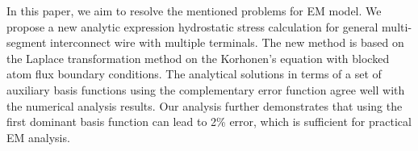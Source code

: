 




In this paper, we aim to resolve the mentioned problems for EM
model. We propose a new analytic expression hydrostatic stress
calculation for general multi-segment interconnect wire with multiple
terminals. The new method is based on the Laplace transformation
method on the Korhonen's equation with blocked atom flux boundary
conditions. The analytical solutions in terms of a set of auxiliary
basis functions using the complementary error function agree well with
the numerical analysis results. Our analysis further demonstrates that
using the first dominant basis function can lead to 2\% error,
which is sufficient for practical EM analysis.

